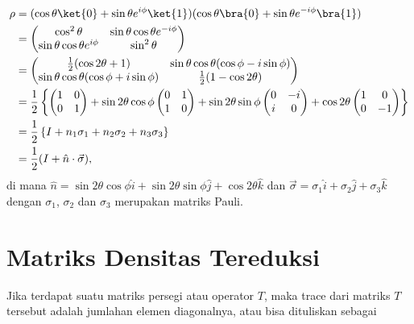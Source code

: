 	\begin{align}\label{rho1kubit}
		\rho&=(\cos\theta\ket{0}+\sin\theta e^{i\phi}\ket{1})(\cos\theta\bra{0}+\sin\theta e^{-i\phi}\bra{1})\nonumber\\
		&=\begin{pmatrix}
			\cos^2\theta & \sin\theta\cos\theta e^{-i\phi} \\
			\sin\theta\cos\theta e^{i\phi} & \sin^2\theta
		\end{pmatrix}\nonumber\\
		&=\begin{pmatrix}
			\frac{1}{2}(\cos2\theta+1)& \sin\theta\cos\theta(\cos\phi-i\sin\phi)\\
			\sin\theta\cos\theta(\cos\phi+i\sin\phi)& \frac{1}{2}(1-\cos2\theta)
		\end{pmatrix}\nonumber\\
		&=\frac{1}{2}\left\{\begin{pmatrix}
			1 & 0 \\
			0 & 1
		\end{pmatrix}+\sin2\theta\cos\phi\begin{pmatrix}
			0 & 1 \\
			1 & 0
		\end{pmatrix}+\sin2\theta\sin\phi\begin{pmatrix}
			0 & -i\\
			i & 0
		\end{pmatrix}+ \cos2\theta\begin{pmatrix}
			1 & 0 \\
			0 & -1
		\end{pmatrix}\right\}\nonumber\\			&=\frac{1}{2}\left\{I+n_1\sigma_1+n_2\sigma_2+n_3\sigma_3\right\}\nonumber\\
		&=\frac{1}{2}(I+\hat{n}\cdot\vec{\sigma}),
	\end{align}
di mana $\hat{n}=\sin2\theta\cos\phi\hat{i}+\sin2\theta\sin\phi\hat{j}+\cos2\theta\hat{k}$ dan $\vec{\sigma}=\sigma_1\hat{i}+\sigma_2\hat{j}+\sigma_3\hat{k}$ dengan $\sigma_1$, $\sigma_2$ dan $\sigma_3$ merupakan matriks Pauli.

\section{Matriks Densitas Tereduksi}

Jika terdapat suatu matriks persegi atau operator $T$, maka trace dari matriks $T$ tersebut adalah jumlahan elemen diagonalnya, atau bisa dituliskan sebagai

